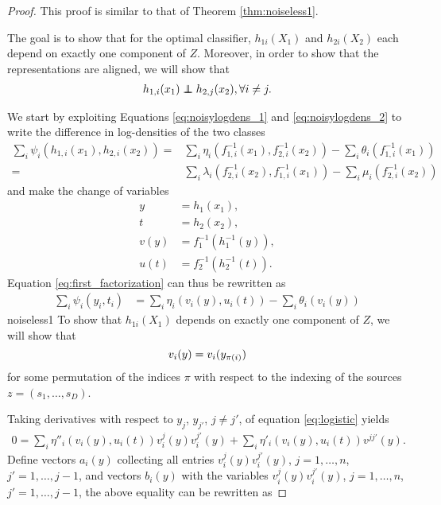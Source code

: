 \begin{proof}
This proof is similar to that of Theorem \ref{thm:noiseless1}.

The goal is to show that for the optimal classifier, $h_{1i}(X_1)$ and $h_{2i}(X_2)$ each depend on exactly one component of $Z$. 
Moreover, in order to show that the representations are aligned, we will show that 
	\begin{align}
	h_{1,i}({x}_{1})\independent h_{2,j}({x}_{2}),\forall i\neq j. \label{eq:inds_twov_3}
	\end{align}
	
	We start by exploiting Equations \ref{eq:noisylogdens_1} and \ref{eq:noisylogdens_2} to write the difference in log-densities of the two classes
	\begin{align}
	\sum_{i}\psi_{i}(h_{1,i}({x}_{1}),h_{2,i}({x}_{2}))
	=&\sum_{i}\eta_{i}({f}_{1,i}^{-1}({x}_{1}), {f}_{2,i}^{-1}({x}_{2})) - \sum_{i}\theta_{i}({f}_{1,i}^{-1}({x}_{1})) \label{eq:first_factorization}\\
	=&\sum_{i}\lambda_{i}({f}_{2,i}^{-1}({x}_{2}), {f}_{1,i}^{-1}({x}_{1})) - \sum_{i}\mu_{i}({f}_{2,i}^{-1}({x}_{2}))\label{eq:2nd_factorization}
	\end{align}
	and make the change of variables
	\begin{align*}
	{y} & ={h}_1({x}_{1}),\\
	{t} & ={h}_2({x}_{2}),\\
	{v}({y}) & ={f}_{1}^{-1}({h}_1^{-1}({y})),\\
	{u}({t}) & ={f}_{2}^{-1}({h}_2^{-1}({t})).
	\end{align*}
	Equation \ref{eq:first_factorization} can thus be rewritten as
	\begin{align}
	\sum_{i}\psi_{i}(y_{i},t_{i}) 
	&=\sum_{i}\eta_{i}(v_i({y}), u_i({t}))
	-\sum_{i}\theta_{i}(v_i({y}))\label{eq:logistic}
	\end{align}
noiseless1
	To show that $h_{1i}(X_1)$ depends on exactly one component of $Z$, we will show that
	\begin{equation}
	\label{eq:v_onev}
	v_{i}({y})  = v_{i}(y_{\pi(i)})\\
	\end{equation}
	for some permutation of the indices $\pi$ with respect to the indexing of the sources ${z} = (s_1, \ldots, s_D)$.
	
	Taking derivatives with respect to $y_j$, $y_{j'}$, $j \neq j'$,  of equation \ref{eq:logistic} yields
	\begin{align*}
	0 = \sum_{i} \eta''_{i}(v_{i}({y}),u_{i}({t}))v^j_i({y})v^{j'}_i({y}) + \sum_{i}\eta'_{i}(v_{i}({y}), u_{i}({t}))v^{jj'}({y}).
	\end{align*}
	Define vectors ${a}_i({y})$ collecting all entries $v_i^j({y})v_i^{j'}({y})$, $j=1, \ldots, n$, $j'=1, \ldots, j-1$, and vectors ${b}_i({y})$ with the variables $v_i^j({y})v_i^{j'}({y})$, $j=1, \ldots, n$, $j'=1, \ldots, j-1$, the above equality can be rewritten as
	

\end{proof}
